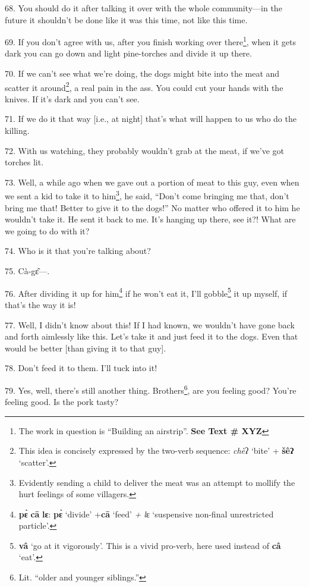 68. You should do it after talking it over with the whole community---in the future
it shouldn't be done like it was this time, not like this time.

69. If you don't agree with us, after you finish working over there\footnote{The work in question is ``Building an airstrip''. \textbf{See Text \# XYZ}}, when
it gets dark you can go down and light pine-torches and divide it up there.

70. If we can't see what we're doing, the dogs might bite into the meat and scatter
it around\footnote{This idea is concisely expressed by the two-verb sequence:\textit{ chè}ʔ `bite' + \textbf{šêʔ} `scatter'.}, a real pain in the ass. You could cut your hands with the knives.
If it's dark and you can't see.

71. If we do it that way [i.e., at night] that's what will happen to us who do
the killing.

72. With us watching, they probably wouldn't grab at the meat, if we've got torches
lit.

73. Well, a while ago when we gave out a portion of meat to this guy, even when
we sent a kid to take it to him\footnote{Evidently sending a child to deliver the meat was an attempt to mollify the hurt feelings of some villagers.}, he said, ``Don't come bringing me that, don't
bring me that! Better to give it to the dogs!'' No matter who offered it to him
he wouldn't take it. He sent it back to me. It's hanging up there, see it?! What
are we going to do with it?

74. Who is it that you're talking about?

75. Cà-gɛ̂---.

76. After dividing it up for him\footnote{\textbf{pɛ̀} \textbf{cā} \textbf{lɛ}: \textbf{pɛ̀} `divide' +\textbf{cā} `feed'\textit{ + l}ɛ `suspensive non-final unrestricted particle'.} if he won't eat it, I'll gobble\footnote{\textbf{vâ} `go at it vigorously'. This is a vivid pro-verb, here used instead of \textbf{câ} `eat'.} it up
myself, if that's the way it is!

77. Well, I didn't know about this! If I had known, we wouldn't have gone back
and forth aimlessly like this. Let's take it and just feed it to the dogs. Even
that would be better [than giving it to that guy].

78. Don't feed it to them. I'll tuck into it!

79. Yes, well, there's still another thing. Brothers\footnote{Lit. ``older and younger siblings.''}, are you feeling good?
You're feeling good. Is the pork tasty?


